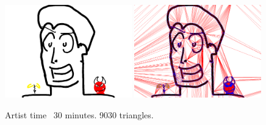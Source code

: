 \documentclass[review]{acmsiggraph}
\begin{document}

\begin{figure}
    \centering
        \includegraphics[width=0.49\textwidth]{images/facezoom}
        \includegraphics[width=0.49\textwidth]{images/facezoomtriangles}
    \caption{Artist time ~30 minutes. 9030 triangles. }
\end{figure}
\end{document}
